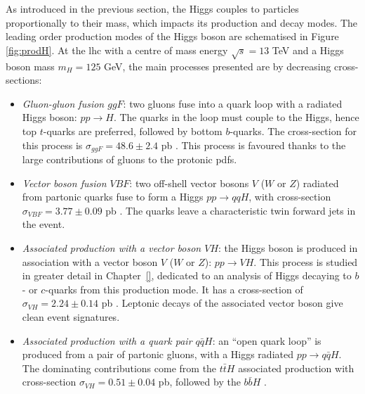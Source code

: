 As introduced in the previous section, the Higgs couples to particles proportionally to their mass, which impacts its production and decay modes. The leading order production modes of the Higgs boson are schematised in Figure \ref{fig:prodH}. At the \gls{lhc} with a centre of mass energy $\sqrt{s} = 13$ TeV and a Higgs boson mass $m_H = 125$ GeV, the main processes presented are by decreasing cross-sections: 
\begin{itemize}[leftmargin=*] %
    \item \textit{Gluon-gluon fusion $ggF$}: two gluons fuse into a quark loop with a radiated Higgs boson: $pp \rightarrow H$. The quarks in the loop must couple to the Higgs, hence top $t$-quarks are preferred, followed by bottom $b$-quarks. The cross-section for this process is $\sigma_{ggF} = 48.6 \pm 2.4$ pb \cite{LHCHiggsCrossSectionWorkingGroup:2016ypw}. This process is favoured thanks to the large contributions of gluons to the protonic \gls{pdf}s.
    \item \textit{Vector boson fusion $VBF$}: two off-shell vector bosons $V$ ($W$ or $Z$) radiated from partonic quarks fuse to form a Higgs $pp \rightarrow qqH$, with cross-section $\sigma_{VBF} = 3.77 \pm 0.09$ pb \cite{LHCHiggsCrossSectionWorkingGroup:2016ypw}. The quarks leave a characteristic twin forward jets in the event.
    \item \textit{Associated production with a vector boson $VH$}: the Higgs boson is produced in association with a vector boson $V$ ($W$ or $Z$): $pp \rightarrow VH$. This process is studied in greater detail in Chapter~\ref{}, dedicated to an analysis of Higgs decaying to $b$- or $c$-quarks from this production mode. It has a cross-section of $\sigma_{VH} = 2.24 \pm 0.14$ pb \cite{LHCHiggsCrossSectionWorkingGroup:2016ypw}. Leptonic decays of the associated vector boson give clean event signatures.
    \item \textit{Associated production with a quark pair $q\bar{q}H$}: an ``open quark loop'' is produced from a pair of partonic gluons, with a Higgs radiated $pp \rightarrow q\bar{q}H$. The dominating contributions come from the $t\bar{t}H$ associated production with cross-section $\sigma_{VH} = 0.51 \pm 0.04$ pb, followed by the $b\bar{b}H$ \cite{LHCHiggsCrossSectionWorkingGroup:2016ypw}.
\end{itemize}

